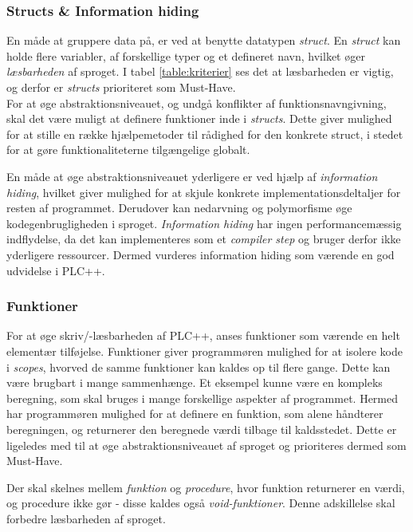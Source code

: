 \subsubsection{Structs \& Information hiding} 
En måde at gruppere data på, er ved at benytte datatypen \textit{struct}. En \textit{struct} kan holde flere variabler, af forskellige typer og et defineret navn, hvilket øger \textit{læsbarheden} af sproget. I tabel \ref{table:kriterier} ses det at læsbarheden er vigtig, og derfor er \textit{structs} prioriteret som Must-Have. \\

\noindent For at øge abstraktionsniveauet, og undgå konflikter af funktionsnavngivning, skal det være muligt at definere funktioner inde i \textit{structs}. Dette giver mulighed for at stille en række hjælpemetoder til rådighed for den konkrete struct, i stedet for at gøre funktionaliteterne tilgængelige globalt.

En måde at øge abstraktionsniveauet yderligere er ved hjælp af \textit{information hiding}, hvilket giver mulighed for at skjule konkrete implementationsdeltaljer for resten af programmet. Derudover kan nedarvning og polymorfisme øge kodegenbrugligheden i sproget. \textit{Information hiding} har ingen performancemæssig indflydelse, da det kan implementeres som et \textit{compiler step} og bruger derfor ikke yderligere ressourcer. Dermed vurderes information hiding som værende en god udvidelse i PLC++.

\subsubsection{Funktioner}
For at øge skriv/-læsbarheden af PLC++, anses funktioner som værende en helt elementær tilføjelse. Funktioner giver programmøren mulighed for at isolere kode i \textit{scopes}, hvorved de samme funktioner kan kaldes op til flere gange. Dette kan være brugbart i mange sammenhænge. Et eksempel kunne være en kompleks beregning, som skal bruges i mange forskellige aspekter af programmet. Hermed har programmøren mulighed for at definere en funktion, som alene håndterer beregningen, og returnerer den beregnede værdi tilbage til kaldsstedet. Dette er ligeledes med til at øge abstraktionsniveauet af sproget og prioriteres dermed som Must-Have.

Der skal skelnes mellem \textit{funktion} og \textit{procedure}, hvor funktion returnerer en værdi, og procedure ikke gør - disse kaldes også \textit{void-funktioner}. Denne adskillelse skal forbedre læsbarheden af sproget. 

